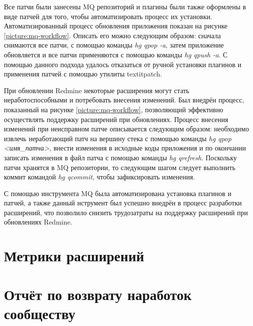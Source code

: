 Все патчи были занесены MQ репозиторий и плагины были также оформлены в виде
патчей для того, чтобы автоматизировать процесс их установки.
Автоматизированный процесс обновления приложения показан на рисунке
\ref{picture:mq-workflow}. Описать его можно следующим образом: сначала
снимаются все патчи, с помощью команды \textit{hg qpop -a}, затем приложение
обновляется и все патчи применяются с помощью команды \textit{hg qpush -a}. С
помощью данного подхода удалось отказаться от ручной установки плагинов и
применения патчей с помощью утилиты textit{patch}.

При обновлении Redmine некоторые расширения могут стать неработоспособными и
потребовать внесения изменений. Был внедрён процесс, показанный на рисунке
\ref{picture:mq-workflow}, позволяющий эффективно осуществлять поддержку
расширений при обновлениях. Процесс внесения изменений при неисправном патче
описывается следующим образом: необходимо извлечь неработающий патч на вершину
стека с помощью команды \textit{hg qpop <имя\_патча>}, внести изменения в
исходные коды приложения и по окончании записать изменения в файл патча с
помощью команды \textit{hg qrefresh}. Поскольку патчи хранятся в MQ
репозитории, то следующим шагом следует выполнить коммит командой \textit{hg
qcommit}, чтобы зафиксировать изменения.

С помощью инструмента MQ была автоматизирована установка плагинов и патчей, а
также данный нструмент был успешно внедрён в процесс разработки расширений,
что позволило снизить трудозатраты на поддержку расширений при обновлениях
Redmine.

\section{Метрики расширений}
\section{Отчёт по возврату наработок сообществу}


